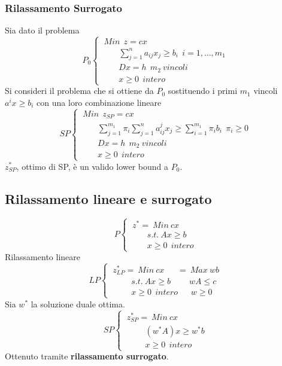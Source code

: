 \subsubsection{Rilassamento Surrogato}
Sia dato il problema
\begin{displaymath}
P_{0}
\begin{cases}
\ Min\ \ z=cx\\
\ \ \ \ \ \ \ \ \ \sum_{j=1}^{n}a_{ij}x_{j}\ge b_{i}\ \ i=1,\dots,m_{1}\\
\ \ \ \ \ \ \ \ \ Dx=h\ \ m_{2}\ vincoli\\
\ \ \ \ \ \ \ \ \ x\ge 0\ \ intero
\end{cases}
\end{displaymath}
Si consideri il problema che si ottiene da $P_{0}$ sostituendo i primi $m_{1}$ vincoli $a^{i}x\ge b_{i}$ con una loro combinazione lineare
\begin{displaymath}
SP
\begin{cases}
\ Min\ \ z_{SP}=cx\\
\ \ \ \ \ \ \ \ \ \sum_{j=1}^{m_{1}}\pi_{i}\sum_{j=1}^{n}a_{ij}^{j}x_{j}\ge \sum_{i=1}^{m_{1}}\pi_{i}b_{i}\ \ \pi_{i}\ge 0\\
\ \ \ \ \ \ \ \ \ Dx=h\ \ m_{2}\ vincoli\\
\ \ \ \ \ \ \ \ \ x\ge 0\ \ intero
\end{cases}
\end{displaymath}
$z_{SP}^{*}$, ottimo di SP, è un valido lower bound a $P_{0}$.

\subsection{Rilassamento lineare e surrogato}
\begin{displaymath}
P
\begin{cases}
\ z^{*}=\ Min\ cx\\
\ \ \ \ \ \ \ \ \ s.t.\ Ax\ge b\\
\ \ \ \ \ \ \ \ \ x\ge 0\ \ intero
\end{cases}
\end{displaymath}
Rilassamento lineare
\begin{displaymath}
LP
\begin{cases}
\ z_{LP}^{*}=\ Min\ cx\ \ \ \ \ \ \ =\ Max\ w b\\
\ \ \ \ \ \ \ \ \ \ \ s.t.\ Ax\ge b\ \ \ \ \ \ \ \ \ \ w A\le c\\
\ \ \ \ \ \ \ \ \ \ \ x\ge 0\ \ intero\ \ \ \ \ \ \ w \ge 0
\end{cases}
\end{displaymath}
Sia $w^{*}$ la soluzione duale ottima.
\begin{displaymath}
SP
\begin{cases}
\ z_{SP}^{*}=\ Min\ cx\\
\ \ \ \ \ \ \ \ \ \ \ (w^{*}A)x\ge w^{*}b\\
\ \ \ \ \ \ \ \ \ \ \ x\ge 0\ \ intero
\end{cases}
\end{displaymath}
Ottenuto tramite \textbf{rilassamento surrogato}.

